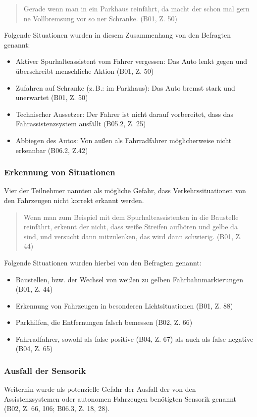 \documentclass[12pt]{article}
\begin{document}
\begin{quote}
  Gerade wenn man in ein Parkhaus reinfährt, da macht der schon mal gern ne Vollbremsung vor so ner Schranke. (B01, Z. 50)
\end{quote}

Folgende Situationen wurden in diesem Zusammenhang von den Befragten genannt:
\begin{itemize}
  \item Aktiver Spurhalteassistent vom Fahrer vergessen: Das Auto lenkt gegen und \glqq überschreibt\grqq{} menschliche Aktion (B01, Z. 50)
  \item Zufahren auf Schranke (z.\,B.: im Parkhaus): Das Auto bremst stark und unerwartet (B01, Z. 50)
  \item Technischer Aussetzer: Der Fahrer ist nicht darauf vorbereitet, dass das Fahrassistenzsystem ausfällt (B05.2, Z. 25)
  \item Abbiegen des Autos: Von außen als Fahrradfahrer möglicherweise nicht erkennbar (B06.2, Z.42)
\end{itemize}

\subsubsection*{Erkennung von Situationen}
Vier der Teilnehmer nannten als mögliche Gefahr, dass Verkehrssituationen von den Fahrzeugen nicht korrekt erkannt werden.

\begin{quote}
  Wenn man zum Beispiel mit dem Spurhalteassistenten in die Baustelle reinfährt, erkennt der nicht, dass weiße Streifen aufhören und gelbe da sind, und versucht dann mitzulenken, das wird dann schwierig. (B01, Z. 44)
\end{quote}

Folgende Situationen wurden hierbei von den Befragten genannt:
\begin{itemize}
  \item Baustellen, bzw. der Wechsel von weißen zu gelben Fahrbahnmarkierungen (B01, Z. 44)
  \item Erkennung von Fahrzeugen in besonderen Lichtsituationen (B01, Z. 88)
  \item Parkhilfen, die Entfernungen falsch bemessen (B02, Z. 66)
  \item Fahrradfahrer, sowohl als false-positive (B04, Z. 67) als auch als false-negative (B04, Z. 65)
\end{itemize}

\subsubsection*{Ausfall der Sensorik}
Weiterhin wurde als potenzielle Gefahr der Ausfall der von den Assistenzsystemen oder autonomen Fahrzeugen benötigten Sensorik genannt (B02, Z. 66, 106; B06.3, Z. 18, 28).
\end{document}
